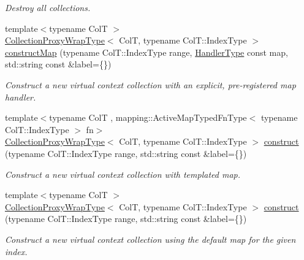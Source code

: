 \begin{DoxyCompactItemize}
\begin{DoxyCompactList}\small\item\em Destroy all collections. \end{DoxyCompactList}\item 
{\footnotesize template$<$typename ColT $>$ }\\\hyperlink{structvt_1_1vrt_1_1collection_1_1_collection_manager_a56458ed7f9bb22b631b9b3a745f42f94}{Collection\+Proxy\+Wrap\+Type}$<$ ColT, typename Col\+T\+::\+Index\+Type $>$ \hyperlink{structvt_1_1vrt_1_1collection_1_1_collection_manager_ac9e0c4bfb1865ebb014ca0dc4b9006f8}{construct\+Map} (typename Col\+T\+::\+Index\+Type range, \hyperlink{namespacevt_af64846b57dfcaf104da3ef6967917573}{Handler\+Type} const map, std\+::string const \&label=\{\})
\begin{DoxyCompactList}\small\item\em Construct a new virtual context collection with an explicit, pre-\/registered map handler. \end{DoxyCompactList}\item 
{\footnotesize template$<$typename ColT , mapping\+::\+Active\+Map\+Typed\+Fn\+Type$<$ typename Col\+T\+::\+Index\+Type $>$ fn$>$ }\\\hyperlink{structvt_1_1vrt_1_1collection_1_1_collection_manager_a56458ed7f9bb22b631b9b3a745f42f94}{Collection\+Proxy\+Wrap\+Type}$<$ ColT, typename Col\+T\+::\+Index\+Type $>$ \hyperlink{structvt_1_1vrt_1_1collection_1_1_collection_manager_a779338baed0f13c1e96b498560db9cbc}{construct} (typename Col\+T\+::\+Index\+Type range, std\+::string const \&label=\{\})
\begin{DoxyCompactList}\small\item\em Construct a new virtual context collection with templated map. \end{DoxyCompactList}\item 
{\footnotesize template$<$typename ColT $>$ }\\\hyperlink{structvt_1_1vrt_1_1collection_1_1_collection_manager_a56458ed7f9bb22b631b9b3a745f42f94}{Collection\+Proxy\+Wrap\+Type}$<$ ColT, typename Col\+T\+::\+Index\+Type $>$ \hyperlink{structvt_1_1vrt_1_1collection_1_1_collection_manager_a14e19098a1e676d5229fc00a2f0cc133}{construct} (typename Col\+T\+::\+Index\+Type range, std\+::string const \&label=\{\})
\begin{DoxyCompactList}\small\item\em Construct a new virtual context collection using the default map for the given index. \end{DoxyCompactList}\item 

\end{DoxyCompactItemize}
